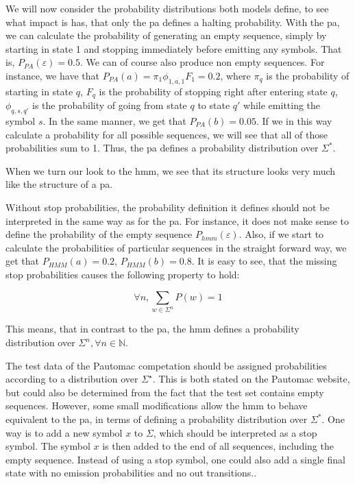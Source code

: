 We will now consider the probability distributions both models define, to see what impact is has, that only the \gls{pa} defines a halting probability.
With the \gls{pa}, we can calculate the probability of generating an empty sequence, simply by starting in state 1 and stopping immediately before emitting any symbols. That is, $P_{PA}(\varepsilon) = 0.5$. We can of course also produce non empty sequences. For instance, we have that $P_{PA}(a) = \pi_1\phi_{1,a,1}F_1 = 0.2$, where $\pi_q$ is the probability of starting in state $q$, $F_q$ is the probability of stopping right after entering state $q$, $\phi_{q,s,q'}$ is the probability of going from state $q$ to state $q'$ while emitting the symbol $s$.
In the same manner, we get that $P_{PA}(b) = 0.05$.
If we in this way calculate a probability for all possible sequences, we will see that all of those probabilities sum to 1. Thus, the \gls{pa} defines a probability distribution over $\Sigma^\ast$\cite{Dupont:2005:LPA:1746577.1746601}.

When we turn our look to the \gls{hmm}, we see that its structure looks very much like the structure of a \gls{pa}.

Without stop probabilities, the probability definition it defines should not be interpreted in the same way as for the \gls{pa}. For instance, it does not make sense to define the probability of the empty sequence $P_{hmm}(\varepsilon)$. Also, if we start to calculate the probabilities of particular sequences in the straight forward way, we get that $P_{HMM}(a) = 0.2$, $P_{HMM}(b) = 0.8$. It is easy to see, that the missing stop probabilities causes the following property to hold:

\[\forall n, \sum_{w \in \Sigma^n} P(w) = 1\]

This means, that in contrast to the \gls{pa}, the \gls{hmm} defines a probability distribution over $\Sigma^n, \forall n \in \mathbb{N}$\cite{Dupont:2005:LPA:1746577.1746601}.

The test data of the Pautomac competation should be assigned probabilities according to a distribution over $\Sigma^\star$.
This is both stated on the Pautomac website, but could also be determined from the fact that the test set contains empty sequences. However, some small modifications allow the \gls{hmm} to behave equivalent to the \gls{pa}, in terms of defining a probability distribution over $\Sigma^\ast$. One way is to add a new symbol $x$ to $\Sigma$, which should be interpreted as a stop symbol. The symbol $x$ is then added to the end of all sequences, including the empty sequence. Instead of using a stop symbol, one could also add a single final state with no emission probabilities and no out transitions.\cite{Dupont:2005:LPA:1746577.1746601}.
